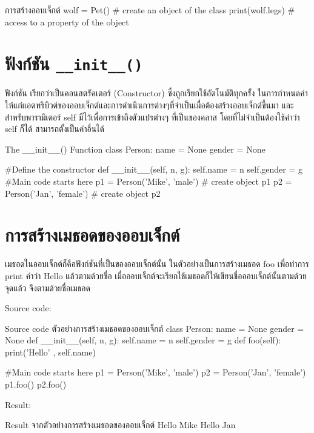 \begin{codelist}{การสร้างออบเจ็กต์}{}
wolf = Pet() # create an object of the class
print(wolf.legs) # access to a property of the object
\end{codelist}


\section{ฟังก์ชัน \texttt{\_\_init\_\_()}}

ฟังก์ชัน  เรียกว่าเป็นคอนสตรัคเตอร์  (Constructor) ซึ่งถูกเรียกใช้อัตโนมัติทุกครั้ง ในการกำหนดค่าให้แก่แอตทริบิวต์ของออบเจ็กต์และการดำเนินการต่างๆที่จำเป็นเมื่อต้องสร้างออบเจ็กต์ขึ้นมา และสำหรับพารามิเตอร์ self มีไว้เพื่อการเข้าถึงตัวแปรต่างๆ ที่เป็นของคลาส โดยที่ไม่จำเป็นต้องใช้คำว่า self ก็ได้ สามารถตั้งเป็นคำอื่นได้

\begin{codelist}{The \_\_init\_\_() Function}{}
class Person:
    name = None
    gender = None
    
    #Define the constructor
    def __init__(self, n, g):
        self.name = n
        self.gender = g
#Main code starts here
p1 = Person('Mike', 'male') # create object p1
p2 = Person('Jan', 'female') # create object p2
\end{codelist}


\section{การสร้างเมธอดของออบเจ็กต์}

เมธอดในออบเจ็กต์ก็คือฟังก์ชันที่เป็นของออบเจ็กต์นั้น ในตัวอย่างเป็นการสร้างเมธอด foo เพื่อทำการ print คำว่า Hello แล้วตามด้วยชื่อ เมื่อออบเจ็กต์จะเรียกใช้เมธอดก็ให้เขียนชื่อออบเจ็กต์นั้นตามด้วยจุดแล้ว จึงตามด้วยชื่อเมธอด

Source code:
\begin{codelist}{Source code ตัวอย่างการสร้างเมธอดของออบเจ็กต์}{}
class Person:
    name = None
    gender = None
    def __init__(self, n, g):
        self.name = n
        self.gender = g
    def foo(self):
        print('Hello' , self.name)

#Main code starts here
p1 = Person('Mike', 'male')
p2 = Person('Jan', 'female')
p1.foo()
p2.foo()
\end{codelist}

Result:
\begin{codelist}{Result จากตัวอย่างการสร้างเมธอดของออบเจ็กต์}{}
Hello Mike
Hello Jan
\end{codelist}


